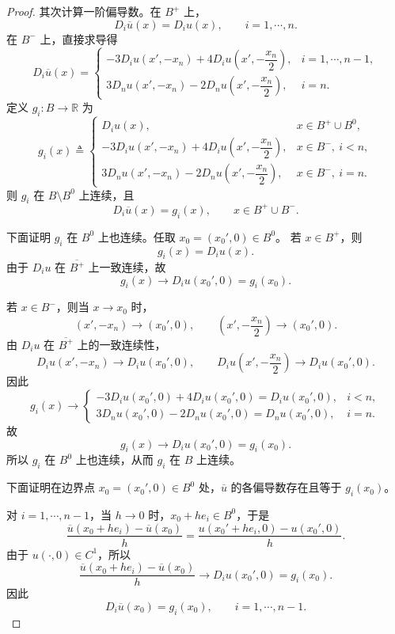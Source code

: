 \documentclass[../../main.tex]{subfiles}%
\begin{document}
\begin{proof}
其次计算一阶偏导数。在 \(B^{+}\) 上，
\[
D_i\overline u(x)=D_i u(x),\qquad i=1,\cdots,n.
\]
在 \(B^{-}\) 上，直接求导得
\[
D_i\overline u(x)=
\begin{cases}
-3D_i u(x',-x_n)+4D_i u\left(x',-\dfrac{x_n}{2}\right), & i=1,\cdots,n-1,\\[6pt]
3D_n u(x',-x_n)-2D_n u\left(x',-\dfrac{x_n}{2}\right), & i=n.
\end{cases}
\]
定义 \(g_i:B\to\mathbb{R}\) 为
\[
g_i(x)\triangleq
\begin{cases}
D_i u(x), & x\in B^{+}\cup B^{0},\\[4pt]
-3D_i u(x',-x_n)+4D_i u\left(x',-\dfrac{x_n}{2}\right), & x\in B^{-},\ i<n,\\[6pt]
3D_n u(x',-x_n)-2D_n u\left(x',-\dfrac{x_n}{2}\right), & x\in B^{-},\ i=n.
\end{cases}
\]
则 \(g_i\) 在 \(B\setminus B^{0}\) 上连续，且
\[
D_i\overline u(x)=g_i(x),\qquad x\in B^{+}\cup B^{-}.
\]

下面证明 \(g_i\) 在 \(B^{0}\) 上也连续。任取 \(x_0=(x_0',0)\in B^{0}\)。
若 \(x\in B^{+}\)，则
\[
g_i(x)=D_i u(x).
\]
由于 \(D_i u\) 在 \(\overline{B^{+}}\) 上一致连续，故
\[
g_i(x)\to D_i u(x_0',0)=g_i(x_0).
\]

若 \(x\in B^{-}\)，则当 \(x\to x_0\) 时，
\[
(x',-x_n)\to(x_0',0),\qquad
\left(x',-\frac{x_n}{2}\right)\to(x_0',0).
\]
由 \(D_i u\) 在 \(\overline{B^{+}}\) 上的一致连续性，
\[
D_i u(x',-x_n)\to D_i u(x_0',0),\qquad
D_i u\left(x',-\frac{x_n}{2}\right)\to D_i u(x_0',0).
\]
因此
\[
g_i(x)\to
\begin{cases}
-3D_i u(x_0',0)+4D_i u(x_0',0)=D_i u(x_0',0), & i<n,\\[4pt]
3D_n u(x_0',0)-2D_n u(x_0',0)=D_n u(x_0',0), & i=n.
\end{cases}
\]
故
\[
g_i(x)\to D_i u(x_0',0)=g_i(x_0).
\]
所以 \(g_i\) 在 \(B^{0}\) 上也连续，从而 \(g_i\) 在 \(B\) 上连续。

下面证明在边界点 \(x_0=(x_0',0)\in B^{0}\) 处，\(\overline u\) 的各偏导数存在且等于 \(g_i(x_0)\)。

对 \(i=1,\cdots,n-1\)，当 \(h\to0\) 时，\(x_0+he_i\in B^{0}\)，于是
\[
\frac{\overline u(x_0+he_i)-\overline u(x_0)}{h}
=
\frac{u(x_0'+he_i,0)-u(x_0',0)}{h}.
\]
由于 \(u(\cdot,0)\in C^{1}\)，所以
\[
\frac{\overline u(x_0+he_i)-\overline u(x_0)}{h}
\to D_i u(x_0',0)=g_i(x_0).
\]
因此
\[
D_i\overline u(x_0)=g_i(x_0),\qquad i=1,\cdots,n-1.
\]


\end{proof}
\end{document}
